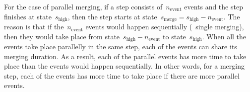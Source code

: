 \documentclass[]{interact}
\begin{document}
For the case of parallel merging,
if a step consists of~$n_\mathrm{event}$ events and 
the step finishes at state~$s_\mathrm{high}$, then the step starts 
at state~$s_\mathrm{merge}=s_\mathrm{high} - n_\mathrm{event}$.
The reason is that if the~$n_\mathrm{event}$ events 
would happen sequentially (\ie~single merging),
then they would take place 
from state~$s_\mathrm{high} - n_\mathrm{event}$ to state~$s_\mathrm{high}$.
When all the events take place parallelly in the same step, 
each of the events can share its merging duration.
As a result,
each of the parallel events has more time to take place
than the events would happen sequentially.
In other words, for a merging step,
each of the events has more time to take place 
if there are more parallel events.
\end{document}

